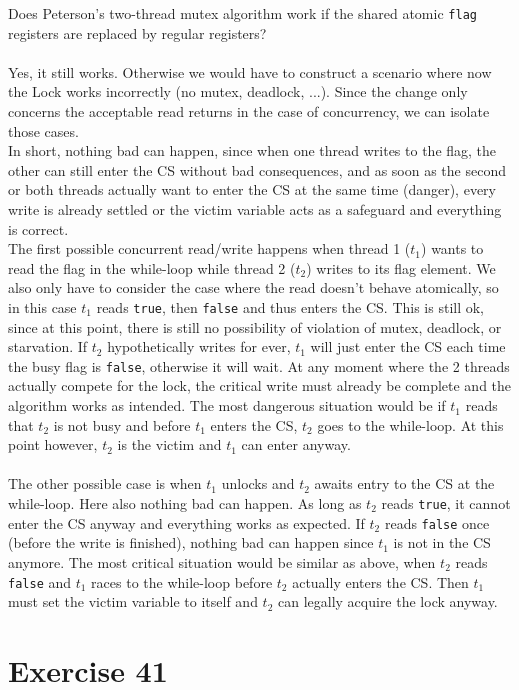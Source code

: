 \documentclass[a4paper,%
11pt,%
DIV=14,
headsepline,%
headings=normal,
]{scrartcl}
\newcommand{\exercise}[1]{\section*{Exercise #1}}
\begin{document}
Does Peterson's two-thread mutex algorithm work if the shared atomic \texttt{flag} registers are replaced by regular registers?\\
\\
Yes, it still works. Otherwise we would have to construct a scenario where now the Lock works incorrectly (no mutex, deadlock, ...). Since the change only concerns the acceptable read returns in the case of concurrency, we can isolate those cases.\\
In short, nothing bad can happen, since when one thread writes to the flag, the other can still enter the CS without bad consequences, and as soon as the second or both threads actually want to enter the CS at the same time (danger), every write is already settled or the victim variable acts as a safeguard and everything is correct.\\
The first possible concurrent read/write happens when thread 1 ($t_1$) wants to read the flag in the while-loop while thread 2 ($t_2$) writes to its flag element. We also only have to consider the case where the read doesn't behave atomically, so in this case $t_1$ reads \texttt{true}, then \texttt{false} and thus enters the CS. This is still ok, since at this point, there is still no possibility of violation of mutex, deadlock, or starvation. If $t_2$ hypothetically writes for ever, $t_1$ will just enter the CS each time the busy flag is \texttt{false}, otherwise it will wait. At any moment where the 2 threads actually compete for the lock, the critical write must already be complete and the algorithm works as intended. The most dangerous situation would be if $t_1$ reads that $t_2$ is not busy and before $t_1$ enters the CS, $t_2$ goes to the while-loop. At this point however, $t_2$ is the victim and $t_1$ can enter anyway.\\
\\
The other possible case is when $t_1$ unlocks and $t_2$ awaits entry to the CS at the while-loop. Here also nothing bad can happen. As long as $t_2$ reads \texttt{true}, it cannot enter the CS anyway and everything works as expected. If $t_2$ reads \texttt{false} once (before the write is finished), nothing bad can happen since $t_1$ is not in the CS anymore. The most critical situation would be similar as above, when $t_2$ reads \texttt{false} and $t_1$ races to the while-loop before $t_2$ actually enters the CS. Then $t_1$ must set the victim variable to itself and $t_2$ can legally acquire the lock anyway.

\exercise{41}
\end{document}
